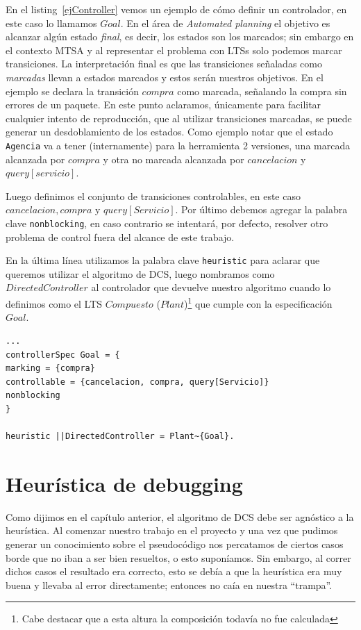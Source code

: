 En el listing~\ref{ejController} vemos un ejemplo de cómo definir un controlador, en este caso lo llamamos $Goal$. En el área de \textit{Automated planning} el objetivo es alcanzar algún estado \textit{final}, es decir, los estados son los marcados; sin embargo en el contexto MTSA y al representar el problema con LTSs solo podemos marcar transiciones. La interpretación final es que las transiciones señaladas como \textit{marcadas} llevan a estados marcados y estos serán nuestros objetivos. En el ejemplo se declara la transición $compra$ como marcada, señalando la compra sin errores de un paquete. En este punto aclaramos, únicamente para facilitar cualquier intento de reproducción, que al utilizar transiciones marcadas, se puede generar un desdoblamiento de los estados. Como ejemplo notar que el estado \texttt{Agencia} va a tener (internamente) para la herramienta 2 versiones, una marcada alcanzada por $compra$ y otra no marcada alcanzada por $cancelacion$ y $query[servicio]$.

Luego definimos el conjunto de transiciones controlables, en este caso $cancelacion, compra$ y $ query[Servicio]$. Por último debemos agregar la palabra clave \texttt{nonblocking}, en caso contrario se intentará, por defecto, resolver otro problema de control fuera del alcance de este trabajo.

En la última línea utilizamos la palabra clave \texttt{heuristic} para aclarar que queremos utilizar el algoritmo de DCS, luego nombramos como $DirectedController$ al controlador que devuelve nuestro algoritmo cuando lo definimos como el LTS $Compuesto$ ($Plant$)\footnote{Cabe destacar que a esta altura la composición todavía no fue calculada} que cumple con la especificación $Goal$.

\begin{lstlisting}[language = mtsa, caption=Ejemplo de Controller y DCS, label=ejController]
...
controllerSpec Goal = {
marking = {compra}
controllable = {cancelacion, compra, query[Servicio]}
nonblocking
}

heuristic ||DirectedController = Plant~{Goal}.
\end{lstlisting}



\section{Heurística de debugging}
Como dijimos en el capítulo anterior, el algoritmo de DCS debe ser agnóstico a la heurística. Al comenzar nuestro trabajo en el proyecto y una vez que pudimos generar un conocimiento sobre el pseudocódigo nos percatamos de ciertos casos borde que no iban a ser bien resueltos, o esto suponíamos. Sin embargo, al correr dichos casos el resultado era correcto, esto se debía a que la heurística era muy buena y llevaba al error directamente; entonces no caía en nuestra ``trampa''.

